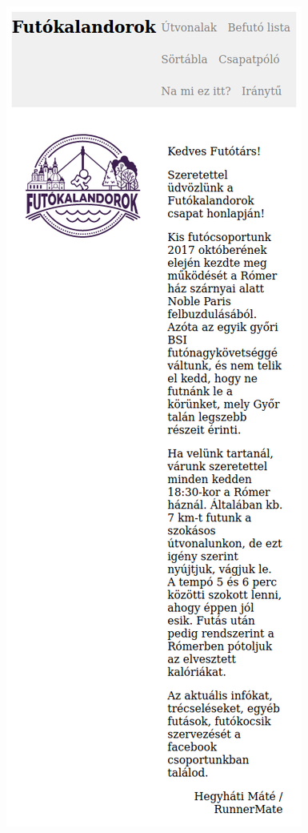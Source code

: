 \begin{frame}
\begin{columns}[T]
      \includegraphics[width=\textwidth]{futokalandorok2.png}
  \end{columns}
\end{frame}


